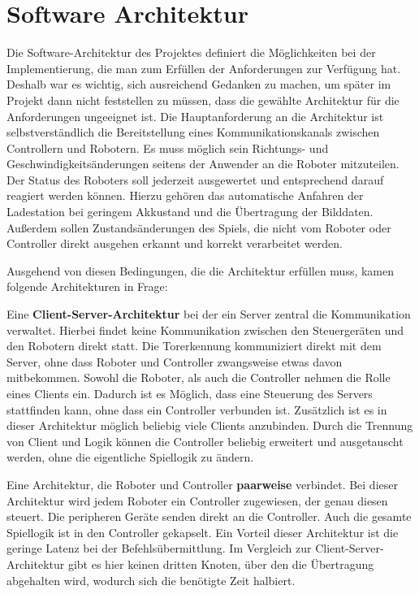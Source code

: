 \section{Software Architektur}
\label{sec:software-architektur}

Die Software-Architektur des Projektes definiert die Möglichkeiten bei der Implementierung, die man zum Erfüllen der Anforderungen zur Verfügung hat. Deshalb war es wichtig, sich ausreichend Gedanken zu machen, um später im Projekt dann nicht feststellen zu müssen, dass die gewählte Architektur für die Anforderungen ungeeignet ist. Die Hauptanforderung an die Architektur ist selbstverständlich die Bereitstellung eines Kommunikationskanals zwischen Controllern und Robotern. Es muss möglich sein Richtungs- und Geschwindigkeitsänderungen seitens der Anwender an die Roboter mitzuteilen. Der Status des Roboters soll jederzeit ausgewertet und entsprechend darauf reagiert werden können. Hierzu gehören das automatische Anfahren der Ladestation bei geringem Akkustand und die Übertragung der Bilddaten. Außerdem sollen Zustandsänderungen des Spiels, die nicht vom Roboter oder Controller direkt ausgehen erkannt und korrekt verarbeitet werden. 

Ausgehend von diesen Bedingungen, die die Architektur erfüllen muss, kamen folgende Architekturen in Frage:

Eine \textbf{Client-Server-Architektur} bei der ein Server zentral die Kommunikation verwaltet. Hierbei findet keine Kommunikation zwischen den Steuergeräten und den Robotern direkt statt. Die Torerkennung kommuniziert direkt mit dem Server, ohne dass Roboter und Controller zwangsweise etwas davon mitbekommen. Sowohl die Roboter, als auch die Controller nehmen die Rolle eines Clients ein. Dadurch ist es Möglich, dass eine Steuerung des Servers stattfinden kann, ohne dass ein Controller verbunden ist. Zusätzlich ist es in dieser Architektur möglich beliebig viele Clients anzubinden. Durch die Trennung von Client und Logik können die Controller beliebig erweitert und ausgetauscht werden, ohne die eigentliche Spiellogik zu ändern.

Eine Architektur, die Roboter und Controller \textbf{paarweise} verbindet. Bei dieser Architektur wird jedem Roboter ein Controller zugewiesen, der genau diesen steuert. Die peripheren Geräte senden direkt an die Controller. Auch die gesamte Spiellogik ist in den Controller gekapselt. Ein Vorteil dieser Architektur ist die geringe Latenz bei der Befehlsübermittlung. Im Vergleich zur Client-Server-Architektur gibt es hier keinen dritten Knoten, über den die Übertragung abgehalten wird, wodurch sich die benötigte Zeit halbiert.



